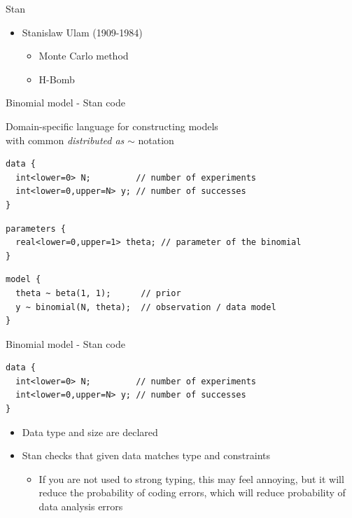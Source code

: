 \documentclass[finnish,english,t]{beamer}
\begin{document}
\begin{frame}{Stan}

  \begin{itemize}
  \item Stanislaw Ulam (1909-1984)
    \begin{itemize}
    \item Monte Carlo method
    \item H-Bomb
    \end{itemize}
  \end{itemize}
  
\end{frame}

\begin{frame}[fragile]{Binomial model - Stan code}

  {Domain-specific language} for constructing models\\
  with common \textit{distributed as} $\sim$ notation


\small
{}  

{
\begin{verbatim}
data {
  int<lower=0> N;         // number of experiments
  int<lower=0,upper=N> y; // number of successes
}
\end{verbatim}
}

{
\begin{verbatim}
parameters {
  real<lower=0,upper=1> theta; // parameter of the binomial
}
\end{verbatim}
}
  
{
\begin{verbatim}
model {
  theta ~ beta(1, 1);      // prior
  y ~ binomial(N, theta);  // observation / data model
}
\end{verbatim}
}

\end{frame} 


\begin{frame}[fragile]{Binomial model - Stan code}
  
  {\small
  \begin{verbatim}
data {
  int<lower=0> N;         // number of experiments
  int<lower=0,upper=N> y; // number of successes
}
\end{verbatim}
  }

  \begin{itemize}
  \item Data type and size are declared
  \item Stan checks that given data matches type and constraints
    \begin{itemize}
    \item<2-> If you are not used to strong typing, this may
      feel annoying, but it will reduce the probability of coding
      errors, which will reduce probability of data analysis errors
    \end{itemize}
  \end{itemize}
\end{frame}
\end{document}
